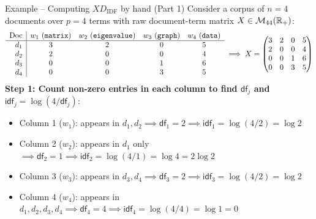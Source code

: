 \documentclass[aspectratio=169]{beamer}\usepackage[]{graphicx}\usepackage[]{xcolor}
\begin{document}
\begin{frame}{Example -- Computing $X D_{\text{IDF}}$ by hand (Part 1)}
Consider a corpus of $n = 4$ documents over $p = 4$ terms with raw document-term matrix $X \in \mathcal{M}_{44}(\mathbb{R}_+)$:
\[
\begin{array}{r|cccc}
\textrm{Doc} & w_1\ ({\tt matrix}) & w_2\ ({\tt eigenvalue}) & w_3\ ({\tt graph}) & w_4\ ({\tt data}) \\
\hline
d_1 & 3 & 2 & 0 & 5 \\
d_2 & 2 & 0 & 0 & 4 \\
d_3 & 0 & 0 & 1 & 6 \\
d_4 & 0 & 0 & 3 & 5
\end{array}
\implies
X = \begin{pmatrix}
3 & 2 & 0 & 5 \\
2 & 0 & 0 & 4 \\
0 & 0 & 1 & 6 \\
0 & 0 & 3 & 5
\end{pmatrix}
\]
\vfill
\textbf{Step 1: Count non-zero entries in each column to find $\mathsf{df}_j$ and $\mathsf{idf}_j = \log(4/\mathsf{df}_j)$}:
\begin{itemize}
\item Column 1 ($w_1$): appears in $d_1, d_2 \implies \mathsf{df}_1 = 2 \implies \mathsf{idf}_1 = \log(4/2) = \log 2$
\item Column 2 ($w_2$): appears in $d_1$ only $\implies \mathsf{df}_2 = 1 \implies \mathsf{idf}_2 = \log(4/1) = \log 4 = 2\log 2$
\item Column 3 ($w_3$): appears in $d_3, d_4 \implies \mathsf{df}_3 = 2 \implies \mathsf{idf}_3 = \log(4/2) = \log 2$
\item Column 4 ($w_4$): appears in $d_1, d_2, d_3, d_4 \implies \mathsf{df}_4 = 4 \implies \mathsf{idf}_4 = \log(4/4) = \log 1 = 0$
\end{itemize}
\end{frame}
\end{document}
